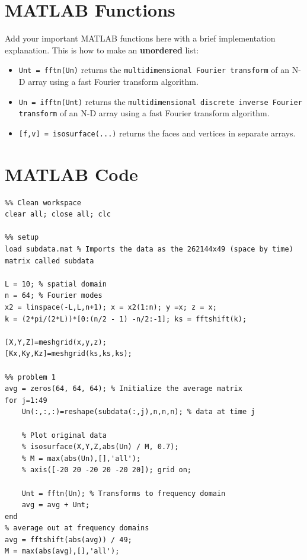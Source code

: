\documentclass{article}
\begin{document}
\newpage
\begin{appendices}

\section{MATLAB Functions}
Add your important MATLAB functions here with a brief implementation explanation. This is how to make an \textbf{unordered} list:
\begin{itemize}
    \item \texttt{Unt = fftn(Un)} returns the \texttt {multidimensional Fourier transform} of an N-D array using a fast Fourier transform algorithm.
    \item \texttt{Un = ifftn(Unt)} returns the \texttt {multidimensional discrete inverse Fourier transform} of an N-D array using a fast Fourier transform algorithm. 
    \item \texttt{[f,v] = isosurface(...)} returns the faces and vertices in separate arrays.
\end{itemize}

\newpage
\section{MATLAB Code}

\begin{listing}[H]
  \begin{verbatim} 
%% Clean workspace
clear all; close all; clc

%% setup
load subdata.mat % Imports the data as the 262144x49 (space by time) matrix called subdata

L = 10; % spatial domain
n = 64; % Fourier modes
x2 = linspace(-L,L,n+1); x = x2(1:n); y =x; z = x;
k = (2*pi/(2*L))*[0:(n/2 - 1) -n/2:-1]; ks = fftshift(k);

[X,Y,Z]=meshgrid(x,y,z);
[Kx,Ky,Kz]=meshgrid(ks,ks,ks);

%% problem 1
avg = zeros(64, 64, 64); % Initialize the average matrix
for j=1:49
    Un(:,:,:)=reshape(subdata(:,j),n,n,n); % data at time j
    
    % Plot original data
    % isosurface(X,Y,Z,abs(Un) / M, 0.7);
    % M = max(abs(Un),[],'all');
    % axis([-20 20 -20 20 -20 20]); grid on;
    
    Unt = fftn(Un); % Transforms to frequency domain
    avg = avg + Unt; 
end
% average out at frequency domains
avg = fftshift(abs(avg)) / 49; 
M = max(abs(avg),[],'all');


\end{verbatim}
\end{listing}
\end{appendices}
\end{document}
